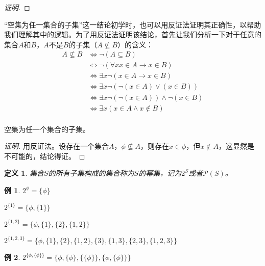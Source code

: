 \documentclass{book}[oneside]
\newtheorem{Def}{定义}[chapter]
\newtheorem*{Example}{例}
\begin{document}
\begin{CJK*}{UTF8}{gbsn}
\begin{proof}[证明]
\end{proof}

“空集为任一集合的子集”这一结论初学时，也可以用反证法证明其正确性，以帮助我们理解其中的逻辑。为了用反证法证明该结论，首先让我们分析一下对于任意的集合$A$和$B$，$A$不是$B$的子集（$A\nsubseteq B$）的含义：
\begin{equation*}
  \begin{split}
    A\nsubseteq B &\Leftrightarrow \lnot(A \subseteq B)\\
    &\Leftrightarrow \lnot( \forall x x \in A \to x \in B)\\
    &\Leftrightarrow \exists x \lnot(x \in A \to x \in B)\\
    &\Leftrightarrow \exists x \lnot( \lnot (x \in A) \lor (x \in B))\\
    &\Leftrightarrow \exists x \lnot( \lnot (x \in A)) \land \lnot ( x \in B)\\
    &\Leftrightarrow \exists x (x \in A \land x \notin B)\\
  \end{split}
\end{equation*}


   空集为任一个集合的子集。 
 \begin{proof}[证明]
   用反证法。设存在一个集合$A$，$\phi \nsubseteq A$，则存在$x\in \phi$，但$x \notin A$，这显然是不可能的，结论得证。   
 \end{proof}  
\begin{Def}
  集合$S$的所有子集构成的集合称为$S$的幂集，记为$2^S$或者$\mathcal{P}(S)$。
\end{Def}
\begin{Example}
      $2^{\phi}=\{\phi\}$

    $2^{\{1\}}=\{\phi, \{1\}\}$

  $2^{\{1,2\}}=\{\phi, \{1\},\{2\},\{1,2\}\}$
  
  $2^{\{1,2,3\}}=\{\phi, \{1\},\{2\},\{1,2\},\{3\},\{1,3\},\{2,3\},\{1,2,3\}\}$
\end{Example}

\begin{Example}
  $2^{\{\phi, \{\phi\}\}}=\{\phi, \{\phi\},\{\{\phi\}\}, \{\phi, \{\phi\}\}\}$
\end{Example}


\end{CJK*}
\end{document}
